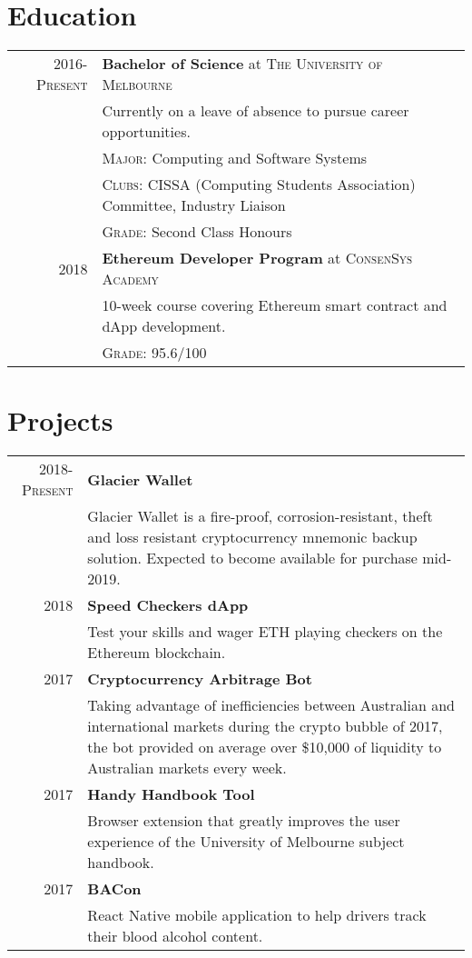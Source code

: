 \documentclass[a4paper,10pt]{article}
\begin{document}
\section{Education}
\begin{tabular}{rl}	
    \textsc{2016-Present} & \textbf{Bachelor of Science} at \textsc{The University of Melbourne}\\
    & Currently on a leave of absence to pursue career opportunities.\\
    & \textsc{Major:} Computing and Software Systems\\
    & \textsc{Clubs:} CISSA (Computing Students Association) Committee, Industry Liaison\\
    & \textsc{Grade:} Second Class Honours\\
    \textsc{2018} & \textbf{Ethereum Developer Program} at \textsc{ConsenSys Academy}\\
    & 10-week course covering Ethereum smart contract and dApp development.\\
    & \textsc{Grade:} 95.6/100
\end{tabular}
\section{Projects}
\begin{tabular}{rp{13.5cm}}	
    \textsc{2018-Present} & \textbf{Glacier Wallet}\\
    & Glacier Wallet is a fire-proof, corrosion-resistant, theft and loss resistant cryptocurrency mnemonic backup solution. Expected to become available for purchase mid-2019.\\
    \textsc{2018} & \textbf{Speed Checkers dApp}\\
    & Test your skills and wager ETH playing checkers on the Ethereum blockchain.\\
    \textsc{2017} & \textbf{Cryptocurrency Arbitrage Bot}\\
    & Taking advantage of inefficiencies between Australian and international markets during the crypto bubble of 2017, the bot provided on average over \$10,000 of liquidity to Australian markets every week.\\
    2017 & \textbf{Handy Handbook Tool}\\
    & Browser extension that greatly improves the user experience of the University of Melbourne subject handbook.\\
    \textsc{2017} & \textbf{BACon}\\
    & React Native mobile application to help drivers track their blood alcohol content.
\end{tabular}
\end{document}
